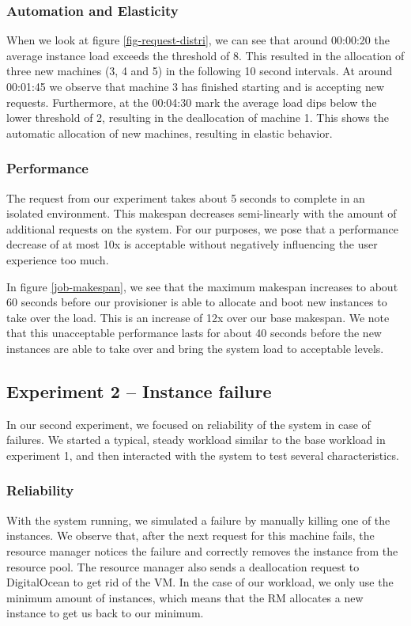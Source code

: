 \documentclass[conference]{IEEEtran}
\begin{document}
\subsubsection{Automation and Elasticity}
When we look at figure \ref{fig-request-distri}, we can see that around 00:00:20 the average instance load exceeds the threshold of 8. This resulted in the allocation of three new machines (3, 4 and 5) in the following 10 second intervals. At around 00:01:45 we observe that machine 3 has finished starting and is accepting new requests. Furthermore, at the 00:04:30 mark the average load dips below the lower threshold of 2, resulting in the deallocation of machine 1. This shows the automatic allocation of new machines, resulting in elastic behavior.


\subsubsection{Performance}

The request from our experiment takes about 5 seconds to complete in an isolated environment. This makespan decreases semi-linearly with the amount of additional requests on the system. For our purposes, we pose that a performance decrease of at most 10x is acceptable without negatively influencing the user experience too much.

In figure \ref{job-makespan}, we see that the maximum makespan increases to about 60 seconds before our provisioner is able to allocate and boot new instances to take over the load. This is an increase of 12x over our base makespan. We note that this unacceptable performance lasts for about 40 seconds before the new instances are able to take over and bring the system load to acceptable levels.


\subsection{Experiment 2 -- Instance failure}
In our second experiment, we focused on reliability of the system in case of failures. We started a typical, steady workload similar to the base workload in experiment 1, and then interacted with the system to test several characteristics.

\subsubsection{Reliability}
With the system running, we simulated a failure by manually killing one of the instances. We observe that, after the next request for this machine fails, the resource manager notices the failure and correctly removes the instance from the resource pool. The resource manager also sends a deallocation request to DigitalOcean to get rid of the VM. In the case of our workload, we only use the minimum amount of instances, which means that the RM allocates a new instance to get us back to our minimum.
\end{document}
